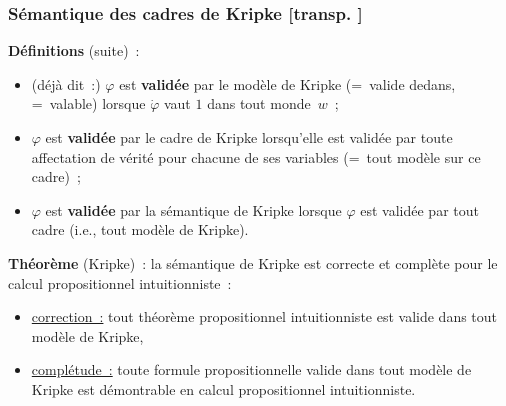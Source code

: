 \documentclass[mathserif,a4paper,aspectratio=169]{beamer}
\renewcommand{\frametitle}[1]{\subsubsection*{#1 {\footnotesize[transp. \insertframenumber]}}}
\begin{document}
\begin{frame}
\frametitle{Sémantique des cadres de Kripke}

\textbf{Définitions} (suite) :
\begin{itemize}
\item {\footnotesize (déjà dit :)} $\varphi$ est \textbf{validée} par
  le \alert{modèle} de Kripke (= valide dedans, = valable) lorsque
  $\dot\varphi$ vaut $1$ dans tout monde $w$ ;
\item $\varphi$ est \textbf{validée} par le \alert{cadre} de Kripke
  lorsqu'elle est validée par toute affectation de vérité pour chacune
  de ses variables (= tout modèle sur ce cadre) ;
\item $\varphi$ est \textbf{validée} par \alert{la sémantique de
  Kripke} lorsque $\varphi$ est validée par \alert{tout} cadre (i.e.,
  tout modèle de Kripke).
\end{itemize}

\bigskip

\textbf{Théorème} (Kripke) : la sémantique de Kripke est correcte et
complète pour le calcul propositionnel intuitionniste :
\begin{itemize}
\item\underline{correction :} tout théorème propositionnel
  intuitionniste est valide dans tout modèle de Kripke,
\item\underline{complétude :} toute formule propositionnelle valide
  dans tout modèle de Kripke est démontrable en calcul propositionnel
  intuitionniste.
\end{itemize}

\end{frame}
%
\end{document}

